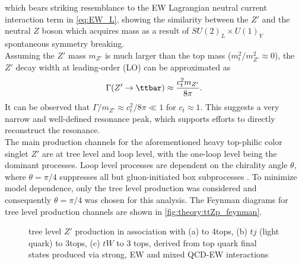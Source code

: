 \documentclass[../thesis.tex]{subfiles}
\begin{document}
which bears striking resemblance to the \acs{EW} Lagrangian neutral current interaction term in \autoref{eq:EW_L}, showing the similarity between the $Z'$ and the neutral $Z$ boson which acquires mass as a result of $SU(2)_L\times U(1)_Y$ spontaneous symmetry breaking.\\
Assuming the $Z'$ mass $m_{Z'}$ is much larger than the top mass ($m_t^2/m_{Z'}^2 \approx 0$), the $Z'$ decay width at leading-order (\acs{LO}) can be approximated as
\begin{equation}
\Gamma(Z' \rightarrow \ttbar) \approx \frac{c_t^2 m_{Z'}}{8\pi}.
\end{equation}
It can be observed that $\Gamma/m_{Z'} \approx c_t^2/8\pi \ll 1$ for $c_t\approx 1$. This suggests a very narrow and well-defined resonance peak, which supports efforts to directly reconstruct the resonance.\\
The main production channels for the aforementioned heavy top-philic color singlet $Z'$ are at tree level and loop level, with the one-loop level being the dominant processes. Loop level processes are dependent on the chirality angle $\theta$, where $\theta=\pi/4$ suppresses all but gluon-initiated box subprocesses \citep{theory:ttZp}. To minimize model dependence, only the tree level production was considered and consequently $\theta=\pi/4$ was chosen for this analysis. The Feynman diagrams for tree level production channels are shown in \autoref{fig:theory:ttZp_feynman}.

\begin{figure}[!htbp]
\centering
{}
\caption[Caption]{\label{fig:theory:ttZp_feynman}tree level $Z'$ production in association with (a) \ttbar to 4tops, (b) $tj$ (light quark) to 3tops, (c) $tW$ to 3 tops, derived from top quark final states produced via strong, \acs{EW} and mixed \acs{QCD}-\acs{EW} interactions \citep{theory:ttZp}}
\end{figure}
\end{document}
